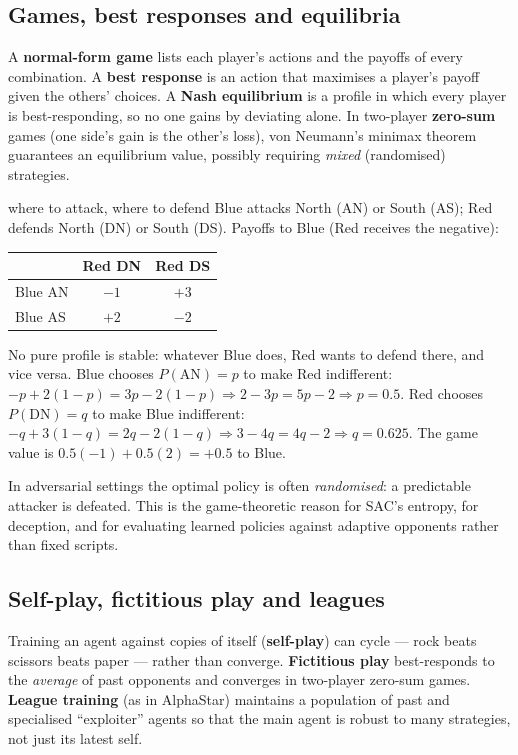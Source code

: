 \documentclass[11pt]{article}
\begin{document}
\subsection{Games, best responses and equilibria}
A \textbf{normal-form game} lists each player's actions and the payoffs of every combination. A \textbf{best response} is an action that maximises a player's payoff given the others' choices. A \textbf{Nash equilibrium} is a profile in which every player is best-responding, so no one gains by deviating alone. In two-player \textbf{zero-sum} games (one side's gain is the other's loss), von Neumann's minimax theorem guarantees an equilibrium value, possibly requiring \emph{mixed} (randomised) strategies.
\begin{example}{where to attack, where to defend}
Blue attacks North (AN) or South (AS); Red defends North (DN) or South (DS). Payoffs to Blue (Red receives the negative):
\begin{center}\renewcommand{\arraystretch}{1.25}\begin{tabular}{lcc}\toprule & Red DN & Red DS\\\midrule Blue AN & $-1$ & $+3$\\ Blue AS & $+2$ & $-2$\\\bottomrule\end{tabular}\end{center}
No pure profile is stable: whatever Blue does, Red wants to defend there, and vice versa. Blue chooses $P(\text{AN})=p$ to make Red indifferent: $-p+2(1-p)=3p-2(1-p)\Rightarrow2-3p=5p-2\Rightarrow p=0.5$. Red chooses $P(\text{DN})=q$ to make Blue indifferent: $-q+3(1-q)=2q-2(1-q)\Rightarrow3-4q=4q-2\Rightarrow q=0.625$. The game value is $0.5(-1)+0.5(2)=+0.5$ to Blue.
\end{example}
\begin{keypoint}In adversarial settings the optimal policy is often \emph{randomised}: a predictable attacker is defeated. This is the game-theoretic reason for SAC's entropy, for deception, and for evaluating learned policies against adaptive opponents rather than fixed scripts.\end{keypoint}

\subsection{Self-play, fictitious play and leagues}
Training an agent against copies of itself (\textbf{self-play}) can cycle --- rock beats scissors beats paper --- rather than converge. \textbf{Fictitious play} best-responds to the \emph{average} of past opponents and converges in two-player zero-sum games. \textbf{League training} (as in AlphaStar) maintains a population of past and specialised ``exploiter'' agents so that the main agent is robust to many strategies, not just its latest self.
\end{document}
